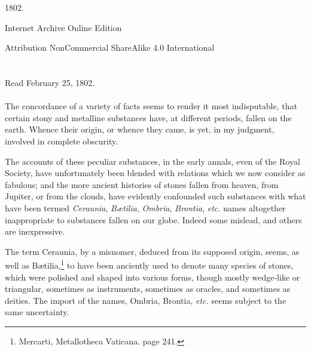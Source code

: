 \documentclass[a4paper, 12pt, oneside, twocolumn]{article}
\begin{document}
\begin{titlepage}
	
		
	\vspace*{\fill}%
	
	1802.%
	
	\vspace{1\baselineskip} %

        Internet Archive Online Edition  %
	
	{\small Attribution NonCommercial ShareAlike 4.0 International } %
\end{titlepage}
\setlength{\parskip}{1mm plus1mm minus1mm}
\setcounter{tocdepth}{3}
\setcounter{secnumdepth}{3}
\section*{}
\begin{center}
Read February 25, 1802.
\end{center}
\paragraph{}
The concordance of a variety of facts seems to render it most indisputable, that certain stony and metalline substances have, at different periods, fallen on the earth. Whence their origin, or whence they came, is yet, in my judgment, involved in complete obscurity.

The accounts of these peculiar substances, in the early annals, even of the Royal Society, have unfortunately been blended with relations which we now consider as fabulous; and the more ancient histories of stones fallen from heaven, from Jupiter, or from the clouds, have evidently confounded such substances with what have been termed \emph{Ceraunia}, \emph{Bætilia}, \emph{Ombria}, \emph{Brontia}, \emph{etc.} names altogether inappropriate to substances fallen on our globe. Indeed some mislead, and others are inexpressive.

The term Ceraunia, by a misnomer, deduced from its supposed origin, seems, as well as Bætilia,\footnote{Mercarti, Metallotheca Vaticana. page 241.} to have been anciently used to denote many species of stones, which were polished and shaped into various forms, though mostly wedge-like or triangular, sometimes as instruments, sometimes as oracles, and sometimes as deities. The import of the names, Ombria, Brontia, \emph{etc.} seems subject to the same uncertainty.
\end{document}
